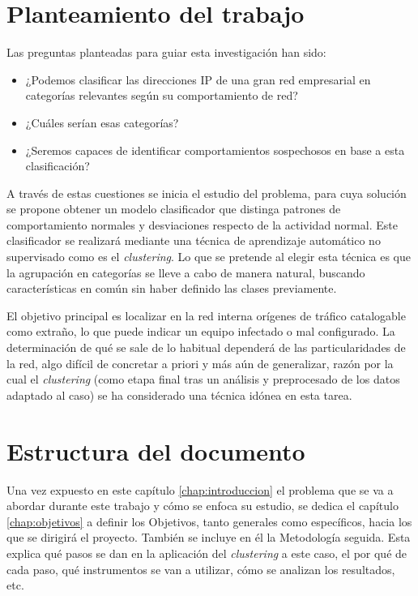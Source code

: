 \section{Planteamiento del trabajo}\label{sec:objetivos}

Las preguntas planteadas para guiar esta investigación han sido:
\begin{itemize}
    \item ¿Podemos clasificar las direcciones IP de una gran red empresarial en categorías relevantes según su comportamiento de red?
    \item ¿Cuáles serían esas categorías?
    \item ¿Seremos capaces de identificar comportamientos sospechosos en base a esta clasificación?
\end{itemize}

A través de estas cuestiones se inicia el estudio del problema, para cuya solución se propone obtener un modelo clasificador que distinga patrones de comportamiento normales y desviaciones respecto de la actividad normal.
Este clasificador se realizará mediante una técnica de aprendizaje automático no supervisado como es el \emph{clustering}.
Lo que se pretende al elegir esta técnica es que la agrupación en categorías se lleve a cabo de manera natural, buscando características en común sin haber definido las clases previamente.

El objetivo principal es localizar en la red interna orígenes de tráfico catalogable como extraño, lo que puede indicar un equipo infectado o mal configurado.
La determinación de qué se sale de lo habitual dependerá de las particularidades de la red, algo difícil de concretar a priori y más aún de generalizar,
razón por la cual el \emph{clustering} (como etapa final tras un análisis y preprocesado de los datos adaptado al caso) se ha considerado una técnica idónea en esta tarea.

\section{Estructura del documento}\label{sec:estructura}

Una vez expuesto en este capítulo \ref{chap:introduccion} el problema que se va a abordar durante este trabajo y cómo se enfoca su estudio,
se dedica el capítulo \ref{chap:objetivos} a definir los Objetivos, tanto generales como específicos, hacia los que se dirigirá el proyecto.
También se incluye en él la Metodología seguida.
Esta explica qué pasos se dan en la aplicación del \emph{clustering} a este caso, el por qué de cada paso, qué instrumentos se van a utilizar, cómo se analizan los resultados, etc.


